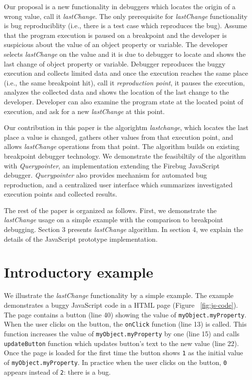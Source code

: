 \documentclass[preprint]{sigplanconf}
\begin{document}
Our proposal is a new functionality in debuggers which locates the origin of a wrong value, call it \textit{lastChange}. The only prerequisite for \textit{lastChange} functionality is bug reproduciblity (i.e., there is a test case which reproduces the bug). Assume that the program execution is paused on a breakpoint and the developer is suspicious about the value of an object property or variable. The developer selects \textit{lastChange} on the value and it is due to debugger to locate and shows the last change of object property or variable. Debugger reproduces the buggy execution and collects limited data and once the execution reaches the same place (i.e., the same breakpoint hit), call it \textit{reproduction point}, it pauses the execution, analyzes the collected data and shows the location of the last change to the developer. Developer can also examine the program state at the located point of execution, and ask for a new \textit{lastChange} at this point.

Our contribution in this paper is the algorightm \textit{lastchange}, which locates the last place a value is changed, gathers other values from that execution point, and allows \textit{lastChange} operations from that point. The algorithm builds on existing breakpoint debugger technology. We demonstrate the feasibiltily of the algorithm with \textit{Querypointer}, an implementation extending the Firebug JavaScript debugger. \textit{Querypointer} also provides mechanism for automated bug reproduction, and a centralized user interface which summarizes investigated execution points and collected results. 

The rest of the paper is organized as follows. First, we demonstrate the \textit{lastChange} usage on a simple example with the comparison to breakpoint debugging. Section 3 presents \textit{lastChange} algorithm. In section 4, we explain the details of the JavaScript prototype implementation. 

\section{Introductory example}

We illustrate the \textit{lastChange} functionality by a simple
example. The example demonstrates a buggy JavaScript code in a HTML
page (Figure ~\ref{fig:js-code}). The page contains a button (line 40)
showing the value of \texttt{myObject.myProperty}.  When the user
clicks on the button, the \texttt{onClick} function (line 13) is
called. This function increases the value of
\texttt{myObject.myProperty} by one (line 15) and calls
\texttt{updateButton} function which updates button's text to the new
value (line 22).  Once the page is loaded for the first time the
button shows \texttt{1} as the initial value of
\texttt{myObject.myProperty}.  In practice when the user clicks on the
button, \texttt{0} appears instead of \texttt{2}: there is a bug.
\end{document}
